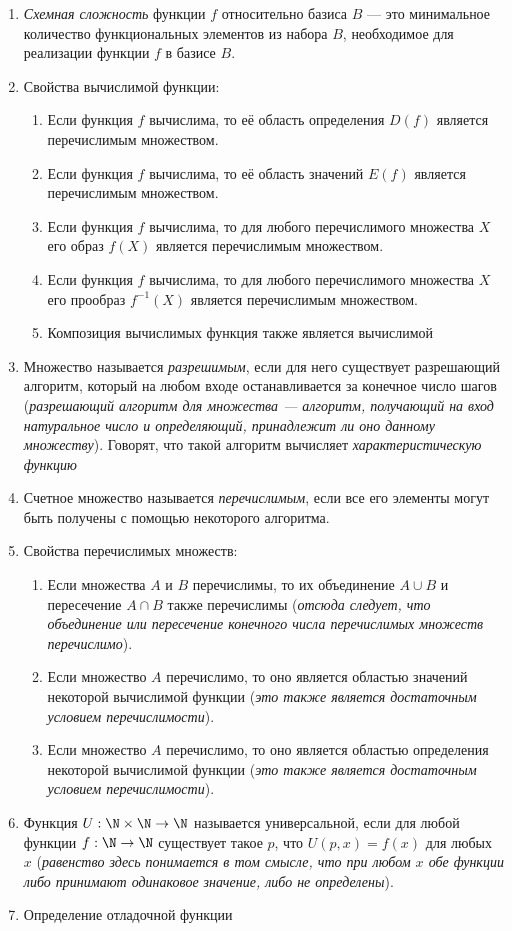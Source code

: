\documentclass[a4paper,12pt]{article}
\begin{document}
\begin{enumerate}
    \item \textit{Схемная сложность} функции $f$ относительно базиса $B$ —
    это минимальное количество функциональных элементов из набора $B$, необходимое
    для реализации функции $f$ в базисе $B$.
    
	\item
    Свойства вычислимой функции:
    \begin{enumerate}
        \item Если функция $f$ вычислима, то её область определения $D(f)$ является перечислимым множеством.
        \item Если функция $f$ вычислима, то её область значений $E(f)$ является перечислимым множеством.
        \item Если функция $f$ вычислима, то для любого перечислимого множества $X$ его образ $f(X)$ является перечислимым множеством.
        \item Если функция $f$ вычислима, то для любого перечислимого множества $X$ его прообраз $f^{-1}(X)$ является перечислимым множеством.
        \item Композиция вычислимых функция также является вычислимой
    \end{enumerate}
    \item
    Множество называется \textit{разрешимым}, если для него существует разрешающий алгоритм, который на любом входе останавливается за конечное число шагов ({\itshape разрешающий алгоритм для множества --- алгоритм, получающий на вход натуральное число и определяющий, принадлежит ли оно данному множеству}). Говорят, что такой алгоритм вычисляет \textit{характеристическую функцию}
    \item
    Счетное множество называется \textit{перечислимым}, если все его элементы могут быть получены с помощью некоторого алгоритма.
    \item
    Свойства перечислимых множеств:
    \begin{enumerate}
        \item Если множества $A$ и $B$ перечислимы, то их объединение $A \cup B$ и пересечение $A \cap B$ также перечислимы (\textit{отсюда следует, что объединение или пересечение конечного числа перечислимых множеств перечислимо}).
        \item Если множество $A$ перечислимо, то оно является областью значений некоторой вычислимой функции (\textit{это также является достаточным условием перечислимости}).
        \item Если множество $A$ перечислимо, то оно является областью определения некоторой вычислимой функции (\textit{это также является достаточным условием перечислимости}).
    \end{enumerate}
    \item
    Функция $U:\N\times\N\to\N$ называется универсальной, если для любой функции $f: \N\to\N$ существует такое $p$, что $U(p, x)=f(x)$ для любых $x$ (\textit{равенство здесь понимается в том смысле, что при любом $x$ обе функции либо принимают одинаковое значение, либо не определены}).
    \item Определение отладочной функции
    

\end{enumerate}
\end{document}
